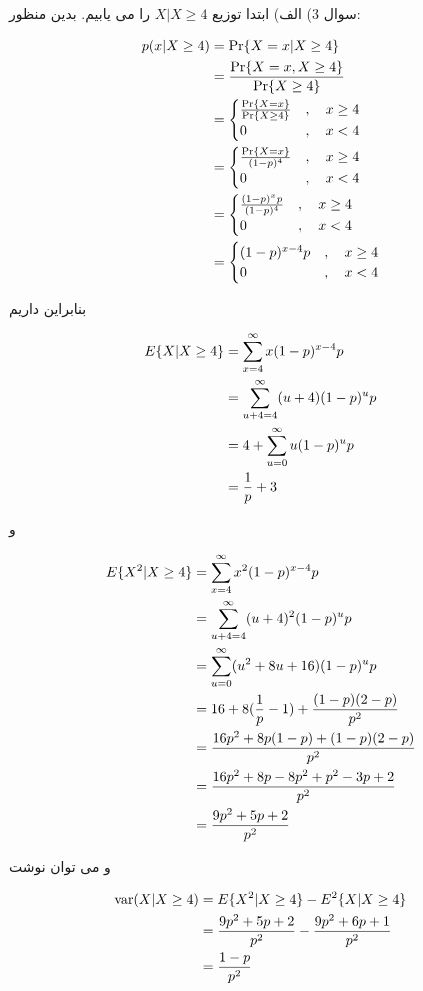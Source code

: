 \documentclass[10pt,letterpaper]{report}
\newcommand{\eqn}[1]{
\[\begin{split}
#1
\end{split}\]
}
\begin{document}
سوال 3) الف) ابتدا توزیع 
$
X|X\ge 4
$
را می یابیم. بدین منظور:
\eqn{
p(x|X\ge4)&=\Pr\{X= x|X\ge 4\}
\\&={\Pr\{X= x,X\ge 4\}\over \Pr\{X\ge 4\}}
\\&=
\begin{cases}
{\Pr\{X= x\}\over \Pr\{X\ge 4\}}&,\quad x\ge 4\\
0&,\quad x< 4
\end{cases}
\\&=
\begin{cases}
{\Pr\{X=x\}\over (1-p)^4}&,\quad x\ge 4\\
0&,\quad x< 4
\end{cases}
\\&=
\begin{cases}
{(1-p)^xp\over (1-p)^4}&,\quad x\ge 4\\
0&,\quad x< 4
\end{cases}
\\&=
\begin{cases}
{(1-p)^{x-4}p}&,\quad x\ge 4\\
0&,\quad x<4
\end{cases}
}
بنابراین داریم

\eqn{
E\{X|X\ge 4\}&=\sum_{x=4}^\infty x(1-p)^{x-4}p
\\&=\sum_{u+4=4}^\infty (u+4)(1-p)^up
\\&=4+\sum_{u=0}^\infty u(1-p)^up
\\&={1\over p}+3
}

و

\eqn{
E\{X^2|X\ge 4\}&=\sum_{x=4}^\infty x^2(1-p)^{x-4}p
\\&=\sum_{u+4=4}^\infty (u+4)^2(1-p)^up
\\&=\sum_{u=0}^\infty (u^2+8u+16)(1-p)^up
\\&=16+8({1\over p}-1)+{(1-p)(2-p)\over p^2}
\\&={16p^2+8p(1-p)+(1-p)(2-p)\over p^2}
\\&={16p^2+8p-8p^2+p^2-3p+2\over p^2}
\\&={9p^2+5p+2\over p^2}
}
و می توان نوشت

\eqn{
\text{var}(X|X\ge 4)&=E\{X^2|X\ge 4\}-E^2\{X|X\ge 4\}
\\&={9p^2+5p+2\over p^2}-{9p^2+6p+1\over p^2}\\&={1-p\over p^2}
}
\end{document}
